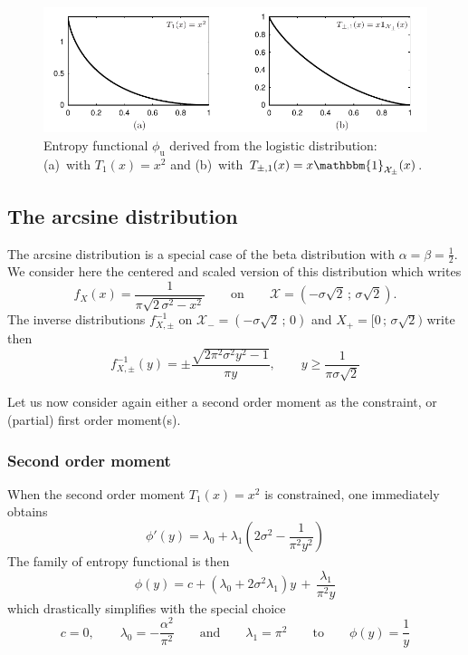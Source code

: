 \documentclass[english,sort&compress]{elsarticle}
\theoremstyle{definition}
\theoremstyle{plain}
\theoremstyle{plain}
\def\X{\mathcal{X}}
\def\un{\mathbbm{1}}
\begin{document}
\

\begin{figure}[htbp]
\centerline{\includegraphics[width=.9\textwidth]{PDF/MaxEnt_LogisticLaw}}
\caption{Entropy  functional  $\phi_{\mathrm{u}}$   derived  from  the  logistic
  distribution:  (a)~with  $T_1(x)  =   x^2$  and  (b)~with  $T_{\pm,1}(x)  =  x
  \un_{\X_\pm}(x)$.}
\label{fig:Entropy-logistic}
\end{figure}




\subsection{The arcsine distribution}
\label{subsec:Arcsine}

The arcsine distribution is a special case of the beta distribution with $\alpha
= \beta  = \frac12$. We  consider here the  centered and scaled version  of this
distribution which writes
%
\[
f_X(x) = \frac{1}{\pi\sqrt{ 2 \, \sigma^2 - x^2}} \qquad \mbox{on} \qquad \X = (
- \sigma \sqrt2 \, ; \, \sigma \sqrt2).
\]
%
The inverse distributions $f_{X,\pm}^{-1}$ on $\X_-  = ( - \sigma \sqrt2 \, ; \,
0 )$ and $X_+ = [ 0 \, ; \, \sigma \sqrt2 )$ write then
%
\[
f_{X,\pm}^{-1}(y) = \pm \frac{\sqrt{2 \pi^2  \sigma^2 y^2 - 1}}{\pi y}, \qquad y
\ge \frac{1}{\pi \sigma \sqrt2}
\]


Let us  now consider again  either a second  order moment as the  constraint, or
(partial) first order moment(s).



\subsubsection{Second order moment}

When  the second order  moment $T_1(x)  = x^2$  is constrained,  one immediately
obtains
%
\[
\phi'(y)=\lambda_0 + \lambda_1\left(2\sigma^{2}-\frac{1}{\pi^{2}y^{2}}\right)
\]
%
The family of entropy functional is then 
%
\[
\phi(y)  = c  +  \left( \lambda_0  +  2 \sigma^2  \lambda_1 \right)  y  \, +  \,
\frac{\lambda_1}{\pi^2 y}
\]
%
which    drastically   simplifies    with    the   special choice
%
\[
c  = 0,  \qquad \lambda_0  = -  \frac{\alpha^2}{\pi^2} \qquad  \mbox{and} \qquad
\lambda_1 = \pi^2 \qquad \mbox{to} \qquad\phi(y) = \frac{1}{y}
\]
%
\end{document}
